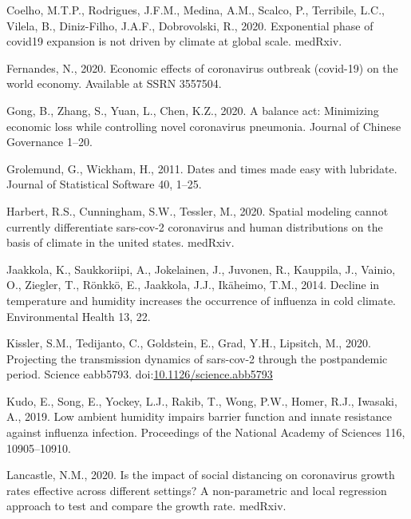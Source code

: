 \documentclass[]{elsarticle} %
\begin{document}
\leavevmode\hypertarget{ref-Coelho2020exponential}{}%
Coelho, M.T.P., Rodrigues, J.F.M., Medina, A.M., Scalco, P., Terribile,
L.C., Vilela, B., Diniz-Filho, J.A.F., Dobrovolski, R., 2020.
Exponential phase of covid19 expansion is not driven by climate at
global scale. medRxiv.

\leavevmode\hypertarget{ref-Fernandes2020economic}{}%
Fernandes, N., 2020. Economic effects of coronavirus outbreak (covid-19)
on the world economy. Available at SSRN 3557504.

\leavevmode\hypertarget{ref-Gong2020balance}{}%
Gong, B., Zhang, S., Yuan, L., Chen, K.Z., 2020. A balance act:
Minimizing economic loss while controlling novel coronavirus pneumonia.
Journal of Chinese Governance 1--20.

\leavevmode\hypertarget{ref-Grolemund2011dates}{}%
Grolemund, G., Wickham, H., 2011. Dates and times made easy with
lubridate. Journal of Statistical Software 40, 1--25.

\leavevmode\hypertarget{ref-Harbert2020spatial}{}%
Harbert, R.S., Cunningham, S.W., Tessler, M., 2020. Spatial modeling
cannot currently differentiate sars-cov-2 coronavirus and human
distributions on the basis of climate in the united states. medRxiv.

\leavevmode\hypertarget{ref-Jaakkola2014decline}{}%
Jaakkola, K., Saukkoriipi, A., Jokelainen, J., Juvonen, R., Kauppila,
J., Vainio, O., Ziegler, T., Rönkkö, E., Jaakkola, J.J., Ikäheimo, T.M.,
2014. Decline in temperature and humidity increases the occurrence of
influenza in cold climate. Environmental Health 13, 22.

\leavevmode\hypertarget{ref-Kissler2020projecting}{}%
Kissler, S.M., Tedijanto, C., Goldstein, E., Grad, Y.H., Lipsitch, M.,
2020. Projecting the transmission dynamics of sars-cov-2 through the
postpandemic period. Science eabb5793.
doi:\href{https://doi.org/10.1126/science.abb5793}{10.1126/science.abb5793}

\leavevmode\hypertarget{ref-Kudo2019low}{}%
Kudo, E., Song, E., Yockey, L.J., Rakib, T., Wong, P.W., Homer, R.J.,
Iwasaki, A., 2019. Low ambient humidity impairs barrier function and
innate resistance against influenza infection. Proceedings of the
National Academy of Sciences 116, 10905--10910.

\leavevmode\hypertarget{ref-Lancastle2020impact}{}%
Lancastle, N.M., 2020. Is the impact of social distancing on coronavirus
growth rates effective across different settings? A non-parametric and
local regression approach to test and compare the growth rate. medRxiv.
\end{document}
